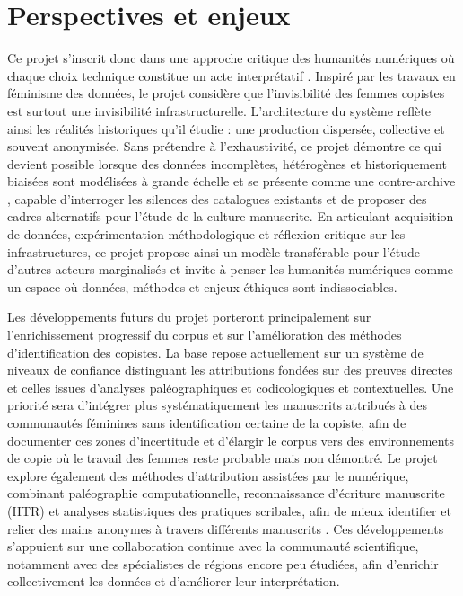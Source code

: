 \documentclass[final, fra]{anthology-ch}      %
\begin{document}
\section{Perspectives et enjeux}

Ce projet s’inscrit donc dans une approche critique des humanités numériques où chaque choix technique constitue un acte interprétatif \cite{Drucker2013PerformativeMateriality}. Inspiré par les travaux en féminisme des données, le projet considère que l’invisibilité des femmes copistes est surtout une invisibilité infrastructurelle.  L’architecture du système reflète ainsi les réalités historiques qu’il étudie : une production dispersée, collective et souvent anonymisée. Sans prétendre à l'exhaustivité, ce projet démontre ce qui devient possible lorsque des données incomplètes, hétérogènes et historiquement biaisées sont modélisées à grande échelle et se présente comme une contre-archive \cite{Blanke2024CounterArchiving, Schweizer2021CounterArchive}, capable d’interroger les silences des catalogues existants et de proposer des cadres alternatifs pour l’étude de la culture manuscrite. En articulant acquisition de données, expérimentation méthodologique et réflexion critique sur les infrastructures, ce projet propose ainsi un modèle transférable pour l’étude d’autres acteurs marginalisés et invite à penser les humanités numériques comme un espace où données, méthodes et enjeux éthiques sont indissociables. 

Les développements futurs du projet porteront principalement sur l’enrichissement progressif du corpus et sur l’amélioration des méthodes d’identification des copistes. La base repose actuellement sur un système de niveaux de confiance distinguant les attributions fondées sur des preuves directes et celles issues d’analyses paléographiques et codicologiques et contextuelles. Une priorité sera d’intégrer plus systématiquement les manuscrits attribués à des communautés féminines sans identification certaine de la copiste, afin de documenter ces zones d’incertitude et d’élargir le corpus vers des environnements de copie où le travail des femmes reste probable mais non démontré. Le projet explore également des méthodes d’attribution assistées par le numérique, combinant paléographie computationnelle, reconnaissance d’écriture manuscrite (HTR) et analyses statistiques des pratiques scribales, afin de mieux identifier et relier des mains anonymes à travers différents manuscrits \cite{wrisley_medieval_2026}. Ces développements s’appuient sur une collaboration continue avec la communauté scientifique, notamment avec des spécialistes de régions encore peu étudiées, afin d’enrichir collectivement les données et d’améliorer leur interprétation.


\printbibliography

\appendix
\end{document}
